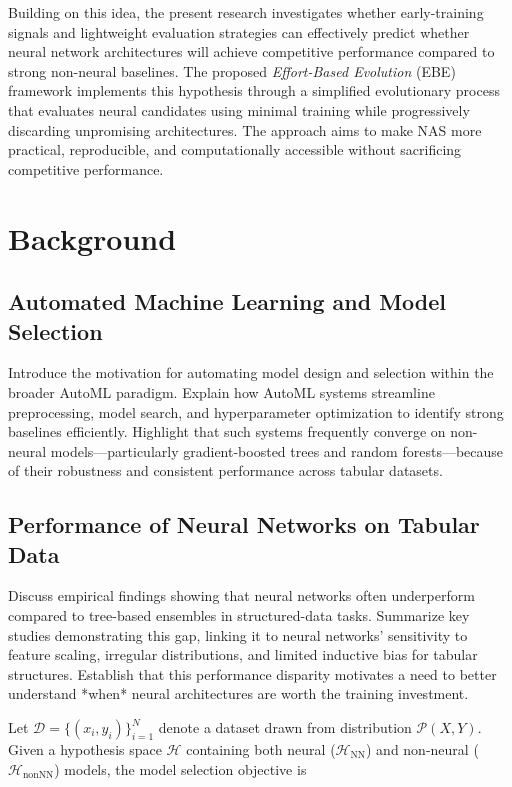 \documentclass[stu,12pt,floatsintext,doublespacing]{apa7}
\begin{document}
Building on this idea, the present research investigates whether early-training signals and lightweight evaluation strategies can effectively predict whether neural network architectures will achieve competitive performance compared to strong non-neural baselines. The proposed \textit{Effort-Based Evolution} (EBE) framework implements this hypothesis through a simplified evolutionary process that evaluates neural candidates using minimal training while progressively discarding unpromising architectures. The approach aims to make NAS more practical, reproducible, and computationally accessible without sacrificing competitive performance.

\section{Background}

\subsection{Automated Machine Learning and Model Selection}
Introduce the motivation for automating model design and selection within the broader AutoML paradigm. 
Explain how AutoML systems streamline preprocessing, model search, and hyperparameter optimization to identify strong baselines efficiently. 
Highlight that such systems frequently converge on non-neural models—particularly gradient-boosted trees and random forests—because of their robustness and consistent performance across tabular datasets.

\subsection{Performance of Neural Networks on Tabular Data}
Discuss empirical findings showing that neural networks often underperform compared to tree-based ensembles in structured-data tasks. 
Summarize key studies demonstrating this gap, linking it to neural networks’ sensitivity to feature scaling, irregular distributions, and limited inductive bias for tabular structures. 
Establish that this performance disparity motivates a need to better understand *when* neural architectures are worth the training investment.

Let $\mathcal{D} = \{(x_i, y_i)\}_{i=1}^{N}$ denote a dataset drawn from distribution $\mathcal{P}(X, Y)$. 
Given a hypothesis space $\mathcal{H}$ containing both neural ($\mathcal{H}_{\text{NN}}$) and non-neural ($\mathcal{H}_{\text{nonNN}}$) models, 
the model selection objective is
\end{document}

